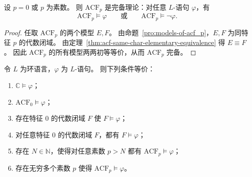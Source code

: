 \documentclass[lang=cn,a4paper,newtx,section]{elegantbook}
\begin{document}
 \begin{corollary}
 \label{acf_p_complete}
 设 $p=0$ 或 $p$ 为素数。
 则 $\mathrm{ACF}_p$ 是完备理论：对任意 $L$-语句 $\varphi$，有
 \[
   \mathrm{ACF}_p\models\varphi\qquad\text{或}\qquad \mathrm{ACF}_p\models\neg\varphi.
 \]
 \end{corollary}
 
 \begin{proof}
 任取 $\mathrm{ACF}_p$ 的两个模型 $E,F$。
 由命题~\ref{pro:models-of-acf_p}，$E,F$ 为同特征 $p$ 的代数闭域。
 由定理~\ref{thm:acf-same-char-elementary-equivalence} 得 $E\equiv F$。
 因此 $\mathrm{ACF}_p$ 的所有模型两两初等等价，从而 $\mathrm{ACF}_p$ 完备。
 \end{proof}
 
 \begin{theorem}[Lefschetz 原理]
 \label{lefschetz-principle}
 令 $L$ 为环语言，$\varphi$ 为 $L$-语句。
 则下列条件等价：
 \begin{enumerate}
   \item $\mathbb C\models\varphi$；
   \item $\mathrm{ACF}_0\models\varphi$；
   \item 存在特征 $0$ 的代数闭域 $F$ 使 $F\models\varphi$；
   \item 对任意特征 $0$ 的代数闭域 $F$，都有 $F\models\varphi$；
   \item 存在 $N\in\mathbb N$，使得对任意素数 $p>N$ 都有 $\mathrm{ACF}_p\models\varphi$；
   \item 存在无穷多个素数 $p$ 使得 $\mathrm{ACF}_p\models\varphi$。
 \end{enumerate}
 \end{theorem}
 
\end{document}
